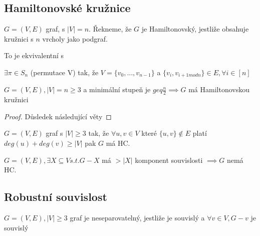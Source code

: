 \documentclass[../main.tex]{subfiles}
\begin{document}
\subsection{Hamiltonovské kružnice}
\begin{definition}
    $G=(V,E)$ graf, s $|V|=n$. Řekneme, že $G$ je Hamiltonovský, jestliže obsahuje kružnici s $n$ vrcholy jako podgraf.
\end{definition}

To je ekvivalentní s
\begin{theorem}
    $\exists \pi \in S_n$ (permutace V) tak, že $V=\{v_0,...,v_{n-1}\}$ a $\{v_i, v_{i+1 mod n}\} \in E, \forall i \in [n]$
\end{theorem}



\begin{theorem}[Dirac]
    $G=(V,E), |V|=n\geq 3$ a minimální stupeň je $geq \frac{n}{2} \implies G$ má Hamiltonovskou kružnici
\end{theorem}
\begin{proof}
    Důsledek následující věty
\end{proof}

\begin{theorem}[ORE]
    $G= (V,E)$ graf s $|V|\geq 3$ tak, že $\forall u,v\in V$ které $\{u,v\}\notin E$ platí $deg(u) + deg(v) \geq |V|$ pak $G$ má HC.    
\end{theorem}

    
    






\begin{claim}
    $G=(V,E), \exists X \subseteq V s.t. G-X$ má $>|X|$ komponent souvislosti $\implies G$ nemá HC. 
\end{claim}

\subsection{Robustní souvislost}

\begin{definition}
    $G=(V,E), |V|\geq 3$ graf je neseparovatelný, jestliže je souvislý a $\forall v \in V, G-v$ je souvislý 
\end{definition}
\end{document}
